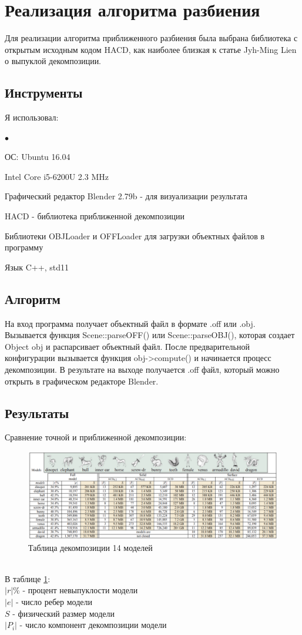 \documentclass[11pt,a4paper]{extarticle}
\newenvironment{compactlist}{
\begin{list}{{$\bullet$}}{
\setlength\partopsep{0pt}
\setlength\parskip{0pt}
\setlength\parsep{0pt}
\setlength\topsep{0pt}
\setlength\itemsep{0pt}
}}{
\end{list}
}
\begin{document}
	\section{Реализация алгоритма разбиения}
		Для реализации алгоритма приближенного разбиения была выбрана библиотека с открытым исходным кодом HACD, как наиболее близкая к статье Jyh-Ming Lien\cite{JMLien06} о выпуклой декомпозиции.
		\subsection{Инструменты}
			Я использовал:
			\begin{compactlist}
				\item ОС: Ubuntu 16.04
				\item Intel Core i5-6200U 2.3 MHz
				\item Графический редактор Blender 2.79b - для визуализации результата
				\item HACD - библиотека приближенной декомпозиции
				\item Библиотеки OBJLoader и OFFLoader для загрузки объектных файлов в программу
				\item Язык C++, std11
			\end{compactlist}
		\subsection{Алгоритм}
			На вход программа получает объектный файл в формате .off или .obj.\\
			Вызывается функция Scene::parseOFF() или Scene::parseOBJ(), которая создает Object obj и распарсивает объектный файл.
			После предварительной конфигурации вызывается функция obj->compute() и начинается процесс декомпозиции.
			В результате на выходе получается .off файл, который можно открыть в графическом редакторе Blender.
		\subsection{Результаты}
		Сравнение точной и приближенной декомпозиции:
		\begin{figure}[ht]
			\centering 
			\includegraphics[width=\textwidth]{result}
			\caption{Таблица декомпозиции 14 моделей}
			\label{result}
		\end{figure}\\
		\noindent
		В таблице \ref{result}:\\
		$|r|\%$ - процент невыпуклости модели\\
		$|e|$ - число ребер модели\\
		$S$ - физический размер	модели \\
		$|P_i|$ - число компонент декомпозиции модели
		
\end{document}
